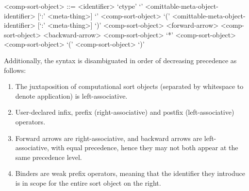 \begin{grammar}
<comp-sort-object> ::= <identifier>
\alt `ctype'
\alt `{' <omittable-meta-object-identifier> [`:' <meta-thing>] `}' <comp-sort-object>
\alt `(' <omittable-meta-object-identifier> [`:' <meta-thing>] `)' <comp-sort-object>
 <forward-arrow> <comp-sort-object>
 <backward-arrow> <comp-sort-object>
 `*' <comp-sort-object>
 <comp-sort-object>
\alt `(' <comp-sort-object> `)'
\end{grammar}

Additionally, the syntax is disambiguated in order of decreasing precedence as follows:

\begin{enumerate}
\item The juxtaposition of computational sort objects (separated by whitespace to denote application) is left-associative.
\item User-declared infix, prefix (right-associative) and postfix (left-associative) operators.
\item Forward arrows are right-associative, and backward arrows are left-associative, with equal precedence, hence they may not both appear at the same precedence level.
\item Binders are weak prefix operators, meaning that the identifier they introduce is in scope for the entire sort object on the right.
\end{enumerate}
